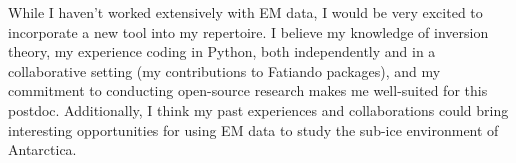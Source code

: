 \documentclass{ExpressiveCoverLetter}
\begin{document}





While I haven't worked extensively with EM data, I
would be very excited to incorporate a new tool into my repertoire. I
believe my knowledge of inversion theory, my experience coding in
Python, both independently and in a collaborative setting (my
contributions to Fatiando packages), and my commitment to conducting open-source
research makes me well-suited for this postdoc.
Additionally, I think my past experiences and collaborations could
bring interesting opportunities for using EM data to study the sub-ice
environment of Antarctica.
\end{document}
